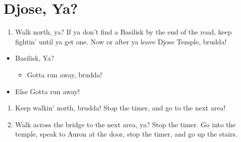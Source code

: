 \chapter{Djose, Ya?}

\begin{enumerate}
\item Walk north, ya? If ya don't find a Basilisk by the end of the road, keep fightin' until ya get one. Now or after ya leave Djose Temple, brudda!
\end{enumerate}
\begin{encounters}
\begin{itemize}
\item Basilisk, Ya?
\begin{itemize}
\kimahrif Gotta use Lancet on that Basilisk, Kimahri! Learn Stone Breath, Ya?
\item Gotta run away, brudda!
\end{itemize}
\item Else Gotta run away!
\end{itemize}
\end{encounters}
\begin{enumerate}[resume]
\item Keep walkin' north, brudda! Stop the timer, and go to the next area!
\item Walk across the bridge to the next area, ya? Stop the timer. Go into the temple, speak to Auron at the door, stop the timer, and go up the stairs.
\end{enumerate}
